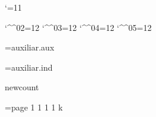 
\catcode`\@=11

\catcode`\^^02=12 \catcode`\^^03=12 \catcode`\^^04=12 \catcode`\^^05=12


\newread\infile

\newif\ifauxf
\openin\infile=auxiliar.aux
\ifeof\infile \auxffalse \else \auxftrue \fi
\closein\infile

\newif\ifindf
\openin\infile=auxiliar.ind
\ifeof\infile \indffalse \else \indftrue \fi
\closein\infile


\ifx\pdfoutput\undefined \csname newcount\endcsname\pdfoutput \fi


\def\cmykWhite{0 0 0 0} \def\cmykDarkWhite{0 0 0 .3}
\def\cmykGray{0 0 0 .5} \def\cmykDarkGray{0 0 0 .7}
\def\cmykBlack{1 1 1 1} \let\cmykDarkBlack=\cmykBlack
\def\cmykYellow{0 0 1 0} \def\cmykDarkYellow{0 0 1 .7}
\def\cmykMagenta{0 1 0 0} \def\cmykDarkMagenta{0 1 0 .7}
\def\cmykCyan{1 0 0 0} \def\cmykDarkCyan{1 0 0 .7}
\def\cmykRed{0 1 1 0} \def\cmykDarkRed{0 1 1 .7}
\def\cmykGreen{1 0 1 0} \def\cmykDarkGreen{1 0 1 .7}
\def\cmykBlue{1 1 0 0} \def\cmykDarkBlue{1 1 0 .7}

\newcount\col@rstack
\def\pdf@color#1{\pdfcolorstack\col@rstack push {\csname cmyk#1\endcsname k}}
 \def\pdf@darkcolor#1{\pdfcolorstack\col@rstack push {\csname cmykDark#1\endcsname k}}
 \def\pdf@endcolor{\pdfcolorstack\col@rstack pop}
\def\dvips@color#1{\special{color push cmyk \csname cmyk#1\endcsname}}
 \def\dvips@darkcolor#1{\special{color push cmyk \csname cmykDark#1\endcsname}}
 \def\dvips@endcolor{\special{color pop}}
\def\dvipdf@color#1{\special{pdf: bc [\csname cmyk#1\endcsname]}}
 \def\dvipdf@darkcolor#1{\special{pdf: bc [\csname cmykDark#1\endcsname]}}
 \def\dvipdf@endcolor{\special{pdf: ec}}

\ifcase\pdfoutput
 \ifx\dvips\undefined
  \let\truecolor=\dvipdf@color
  \def\colors{\let\color=\dvipdf@color\let\endcolor=\dvipdf@endcolor}
  \def\darkcolors{\let\color=\dvipdf@darkcolor\let\endcolor=\dvipdf@endcolor}
 \else
  \let\truecolor=\dvips@color
  \def\colors{\let\color=\dvips@color\let\endcolor=\dvips@endcolor}
  \def\darkcolors{\let\color=\dvips@darkcolor\let\endcolor=\dvips@endcolor}
 \fi
\else
 \col@rstack=\pdfcolorstackinit page {1 1 1 1 k}
 \let\truecolor=\pdf@color
 \def\colors{\let\color=\pdf@color\let\endcolor=\pdf@endcolor}
 \def\darkcolors{\let\color=\pdf@darkcolor\let\endcolor=\pdf@endcolor}
\fi


